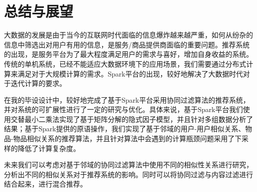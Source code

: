 \chapter{总结与展望}
大数据的发展是由于当今的互联网时代面临的信息爆炸越来越严重，如何从纷杂的信息中筛选出对用户有用的信息，是服务/商品提供商面临的重要问题。推荐系统的出现，是服务平台为了最大程度满足用户的需求与喜好，增加自身收益的系统。传统的单机系统，已经不能适应大数据环境下的应用场景，我们需要通过分布式计算来满足对于大规模计算的需求。Spark平台的出现，较好地解决了大数据时代对于迭代计算的要求。

在我的毕设设计中，较好地完成了基于Spark平台采用协同过滤算法的推荐系统，并对系统的可扩展性进行了一定的研究与优化。具体来说，基于Spark平台我们使用交替最小二乘法实现了基于矩阵分解的隐式因子模型，并且针对多组数据分析了结果；基于Spark提供的原语操作，我们实现了基于邻域的用户-用户相似关系、物品-物品相似关系的推荐算法，并且针对算法中会遇到的计算瓶颈问题采用了下采样的降低了计算复杂度。

未来我们可以考虑对基于邻域的协同过滤算法中使用不同的相似性关系进行研究，分析出不同的相似关系对于推荐系统的影响。同时可以将协同过滤与内容过滤进行结合起来，进行混合推荐。

